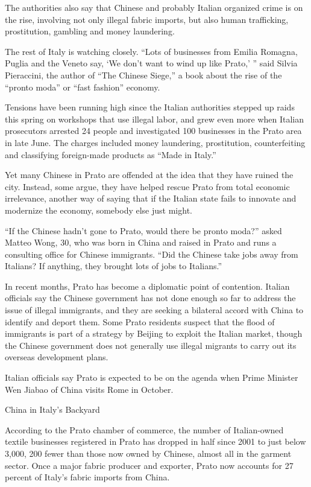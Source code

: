 ﻿\documentclass[12pt]{article}
\begin{document}
The authorities also say that Chinese and probably Italian organized crime is on the rise, involving
not only illegal fabric imports, but also human trafficking, prostitution, gambling and money
laundering.

The rest of Italy is watching closely. ``Lots of businesses from Emilia Romagna, Puglia and the
Veneto say, `We don't want to wind up like Prato,' '' said Silvia Pieraccini, the author of ``The
Chinese Siege,'' a book about the rise of the ``pronto moda'' or ``fast fashion'' economy.

Tensions have been running high since the Italian authorities stepped up raids this spring on
workshops that use illegal labor, and grew even more when Italian prosecutors arrested 24 people and
investigated 100 businesses in the Prato area in late June. The charges included money laundering,
prostitution, counterfeiting and classifying foreign-made products as ``Made in Italy.''

Yet many Chinese in Prato are offended at the idea that they have ruined the city. Instead, some
argue, they have helped rescue Prato from total economic irrelevance, another way of saying that if
the Italian state fails to innovate and modernize the economy, somebody else just might.

``If the Chinese hadn't gone to Prato, would there be pronto moda?'' asked Matteo Wong, 30, who was
born in China and raised in Prato and runs a consulting office for Chinese immigrants. ``Did the
Chinese take jobs away from Italians? If anything, they brought lots of jobs to Italians.''

In recent months, Prato has become a diplomatic point of contention. Italian officials say the
Chinese government has not done enough so far to address the issue of illegal immigrants, and they
are seeking a bilateral accord with China to identify and deport them. Some Prato residents suspect
that the flood of immigrants is part of a strategy by Beijing to exploit the Italian market, though
the Chinese government does not generally use illegal migrants to carry out its overseas development
plans.

Italian officials say Prato is expected to be on the agenda when Prime Minister Wen Jiabao of China
visits Rome in October.

\textsf{China in Italy's Backyard}

According to the Prato chamber of commerce, the number of Italian-owned textile businesses
registered in Prato has dropped in half since 2001 to just below 3,000, 200 fewer than those now
owned by Chinese, almost all in the garment sector. Once a major fabric producer and exporter, Prato
now accounts for 27 percent of Italy's fabric imports from China.
\end{document}
